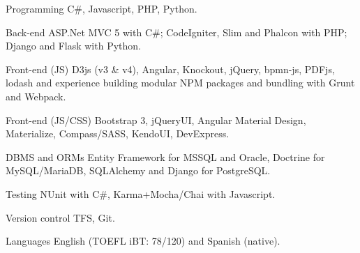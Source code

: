 


\begin{cvskills}


\cvskill
{Programming} %
{C\#, Javascript, PHP, Python.} %


\cvskill
{Back-end} %
{ASP.Net MVC 5 with C\#; CodeIgniter, Slim and Phalcon with PHP; Django and Flask with Python.} %


\cvskill
{Front-end (JS)} %
{D3js (v3 \& v4), Angular, Knockout, jQuery, bpmn-js, PDFjs, lodash and experience building modular NPM packages and bundling with Grunt and Webpack.} %
	

\cvskill
{Front-end (JS/CSS)} %
{Bootstrap 3, jQueryUI, Angular Material Design, Materialize, Compass/SASS, KendoUI, DevExpress.} %


\cvskill
{DBMS and ORMs} %
{Entity Framework for MSSQL and Oracle, Doctrine for MySQL/MariaDB, SQLAlchemy and Django for PostgreSQL.} %



\cvskill
{Testing} %
{NUnit with C\#, Karma+Mocha/Chai with Javascript.} %



\cvskill
{Version control} %
{TFS, Git.} %



\cvskill
{Languages} %
{English (TOEFL iBT: 78/120) and Spanish (native).} %


\end{cvskills}